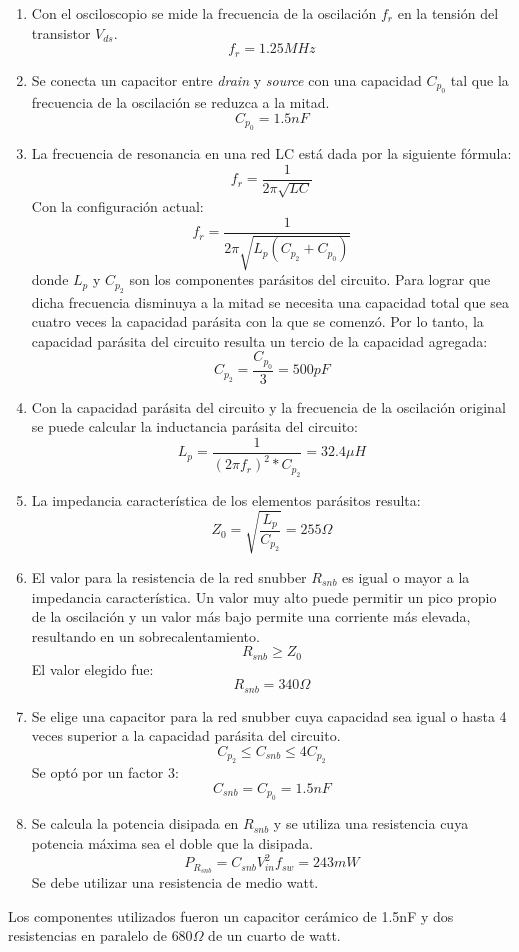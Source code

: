 \begin{enumerate}
    \item Con el osciloscopio se mide la frecuencia de la oscilación $f_{r}$ en la tensión del transistor $V_{ds}$. 
    $$ f_{r}=1.25MHz $$ 
    \item Se conecta un capacitor entre \textit{drain} y \textit{source} con una capacidad $C_{p_{0}}$ tal que la frecuencia de la oscilación se reduzca a la mitad. 
    $$ C_{p_{0}}=1.5nF $$
    \item La frecuencia de resonancia en una red LC está dada por la siguiente fórmula:
    $$ f_{r}=\frac{1}{2\pi\sqrt{LC}} $$
    Con la configuración actual: 
    $$ f_{r}=\frac{1}{2\pi\sqrt{L_{p}(C_{p_{2}}+C_{p_{0}})}} $$
    donde $L_{p}$ y $C_{p_2}$ son los componentes parásitos del circuito.
    Para lograr que dicha frecuencia disminuya a la mitad se necesita una capacidad total que sea cuatro veces la capacidad parásita con la que se comenzó.
    Por lo tanto, la capacidad parásita del circuito resulta un tercio de la capacidad agregada:
    $$ C_{p_{2}} = \frac{C_{p_{0}}}{3}=500pF $$
    \item Con la capacidad parásita del circuito y la frecuencia de la oscilación original se puede calcular la inductancia parásita del circuito:
    $$ L_{p}=\frac{1}{(2\pi f_{r})^{2}*C_{p_{2}}}=32.4\mu H $$
    \item La impedancia característica de los elementos parásitos resulta:
    $$ Z_{0}=\sqrt{\frac{L_p}{C_{p_2}}}=255\Omega $$
\item El valor para la resistencia de la red snubber $R_{snb}$ es igual o mayor a la impedancia característica. 
Un valor muy alto puede permitir un pico propio de la oscilación y un valor más bajo permite una corriente más elevada, resultando en un sobrecalentamiento.
$$ R_{snb} \ge Z_{0} $$
El valor elegido fue:
    $$ R_{snb}=340\Omega $$
    \item Se elige una capacitor para la red snubber cuya capacidad sea igual o hasta 4 veces superior a la capacidad parásita del circuito. 
    $$ C_{p_2}\leq C_{snb}\leq 4C_{p_2} $$
    Se optó por un factor 3:
    $$ C_{snb}=C_{p_{0}}=1.5nF $$
    \item Se calcula la potencia disipada en $R_{snb}$ y se utiliza una resistencia cuya potencia máxima sea el doble que la disipada.
    $$ P_{R_{snb}}=C_{snb}V_{in}^2f_{sw}= 243mW $$  
    Se debe utilizar una resistencia de medio watt.
\end{enumerate}

Los componentes utilizados fueron un capacitor cerámico de 1.5nF y dos resistencias en paralelo de $680\Omega$ de un cuarto de watt. 